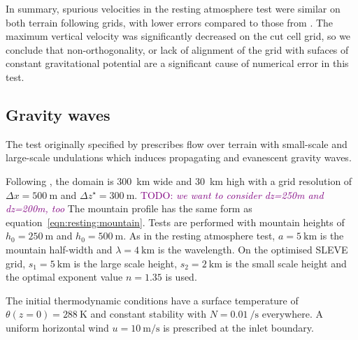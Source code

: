 \documentclass[draft]{ametsoc}
\newcommand{\TODO}[1]{\textcolor{purple}{TODO: \emph{#1}}}
\begin{document}
In summary, spurious velocities in the resting atmosphere test were similar on both terrain following grids, with lower errors compared to those from \citet{klemp2011}.  The maximum vertical velocity was significantly decreased on the cut cell grid, so we conclude that non-orthogonality, or lack of alignment of the grid with sufaces of constant gravitational potential are a significant cause of numerical error in this test.


\subsection{Gravity waves}
\label{sec:gw}
The test originally specified by \citet{schaer2002} prescribes flow over terrain with small-scale and large-scale undulations which induces propagating and evanescent gravity waves.

Following \citet{melvin2010}, the domain is \SI{300}{\kilo\meter} wide and \SI{30}{\kilo\meter} high with a grid resolution of \(\Delta x = \SI{500}{\meter}\) and \(\Delta z^\star = \SI{300}{\meter}\).  \TODO{we want to consider dz=250m and dz=200m, too} The mountain profile has the same form as equation~\ref{eqn:resting:mountain}.  Tests are performed with mountain heights of $h_0 = \SI{250}{\meter}$ and \(h_0 = \SI{500}{\meter}\).  As in the resting atmosphere test, $a = \SI{5}{\kilo\meter}$ is the mountain half-width and $\lambda = \SI{4}{\kilo\meter}$ is the wavelength.  On the optimised SLEVE grid, $s_1 = \SI{5}{\kilo\meter}$ is the large scale height, $s_2 = \SI{2}{\kilo\meter}$ is the small scale height and the optimal exponent value $n = 1.35$ is used.

The initial thermodynamic conditions have a surface temperature of $\theta(z=0) = \SI{288}{\kelvin}$ and constant stability with $N = \SI{0.01}{\per\second}$ everywhere.  A uniform horizontal wind $u = \SI{10}{\meter\per\second}$ is prescribed at the inlet boundary.
\end{document}
